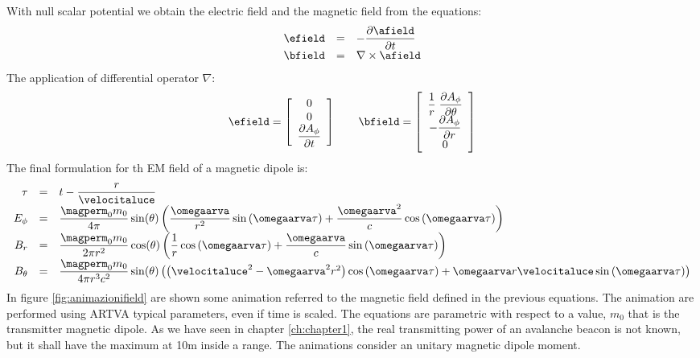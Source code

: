 With null scalar potential we obtain the electric field and the magnetic field from the equations:
\begin{equation}
\begin{array}{rcl}
\efield & = & - \partialtarg{\afield} \\
\bfield & = & \nabla\times\afield 
\end{array}
\end{equation}
The application of differential operator $\nabla$:
\begin{equation}
\efield = \left[ \begin{array}{c} 0 \\ 0 \\ \partialtarg{A_{\phi}} \end{array} \right]
\qquad
\bfield = \left[ \begin{array}{c} \dfrac{1}{r}\;\dfrac{\partial A_{\phi}}{\partial \theta} \\ - \dfrac{\partial A_{\phi}}{\partial r} \\ 0 \end{array} \right]
\end{equation}
The final formulation for th EM field of a magnetic dipole is:
\begin{equation}
\begin{array}{rcl}
\label{eq:campidef1}
\tau & = &  t - \dfrac{r}{\velocitaluce} \\
E_{\phi} & = & \dfrac{\magperm_0 m_0}{4\pi}\sin(\theta)\left( \dfrac{\omegaarva}{r^2}\sin\left( \omegaarva\tau \right) + \dfrac{\omegaarva^2}{c}\cos\left( \omegaarva\tau \right) \right) \\
B_{r} & = & \dfrac{\magperm_0 m_0}{2\pi r^2}\cos(\theta)\left( \dfrac{1}{r}\cos\left( \omegaarva\tau \right) + \dfrac{\omegaarva}{c}\sin\left( \omegaarva\tau \right) \right) \\
B_{\theta} & = & \dfrac{\magperm_0 m_0}{4 \pi r^3 c^2}\sin(\theta)\left( \left( \velocitaluce^2 - \omegaarva^2 r^2 \right)\cos\left( \omegaarva\tau \right) + \omegaarva r \velocitaluce \sin\left( \omegaarva\tau \right) \right) 
\end{array}
\end{equation}
In figure \ref{fig:animazionifield} are shown some animation referred to the magnetic field defined in the previous equations. The animation are performed using ARTVA typical parameters, even if time is scaled. The equations are parametric with respect to a value, $m_0$ that is the transmitter magnetic dipole. As we have seen in chapter \ref{ch:chapter1}, the real transmitting power of an avalanche beacon is not known, but it shall have the maximum at \num{10}\si{\meter} inside a range. The animations consider an unitary magnetic dipole moment.

